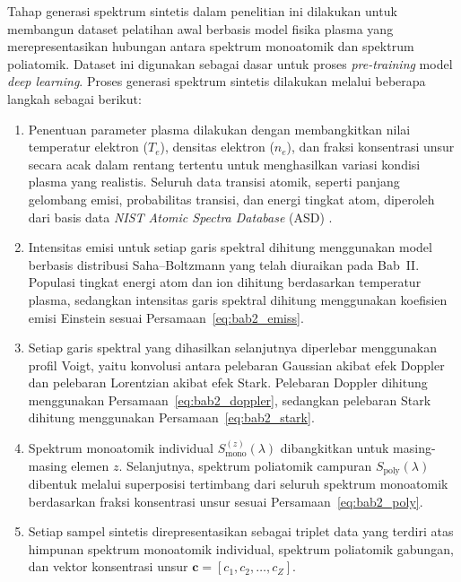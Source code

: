 Tahap generasi spektrum sintetis dalam penelitian ini dilakukan untuk membangun dataset pelatihan awal berbasis model fisika plasma yang merepresentasikan hubungan antara spektrum monoatomik dan spektrum poliatomik. Dataset ini digunakan sebagai dasar untuk proses \textit{pre-training} model \textit{deep learning}. Proses generasi spektrum sintetis dilakukan melalui beberapa langkah sebagai berikut:

\begin{enumerate}
    \item Penentuan parameter plasma dilakukan dengan membangkitkan nilai temperatur elektron ($T_e$), densitas elektron ($n_e$), dan fraksi konsentrasi unsur secara acak dalam rentang tertentu untuk menghasilkan variasi kondisi plasma yang realistis. Seluruh data transisi atomik, seperti panjang gelombang emisi, probabilitas transisi, dan energi tingkat atom, diperoleh dari basis data \textit{NIST Atomic Spectra Database} (ASD) \citep{kramida_nist_2024}.

    \item Intensitas emisi untuk setiap garis spektral dihitung menggunakan model berbasis distribusi Saha--Boltzmann yang telah diuraikan pada Bab~II. Populasi tingkat energi atom dan ion dihitung berdasarkan temperatur plasma, sedangkan intensitas garis spektral dihitung menggunakan koefisien emisi Einstein sesuai Persamaan~\ref{eq:bab2_emiss}.

    \item Setiap garis spektral yang dihasilkan selanjutnya diperlebar menggunakan profil Voigt, yaitu konvolusi antara pelebaran Gaussian akibat efek Doppler dan pelebaran Lorentzian akibat efek Stark. Pelebaran Doppler dihitung menggunakan Persamaan~\ref{eq:bab2_doppler}, sedangkan pelebaran Stark dihitung menggunakan Persamaan~\ref{eq:bab2_stark}.

    \item Spektrum monoatomik individual $S_{\mathrm{mono}}^{(z)}(\lambda)$ dibangkitkan untuk masing-masing elemen $z$. Selanjutnya, spektrum poliatomik campuran $S_{\mathrm{poly}}(\lambda)$ dibentuk melalui superposisi tertimbang dari seluruh spektrum monoatomik berdasarkan fraksi konsentrasi unsur sesuai Persamaan~\ref{eq:bab2_poly}.

    \item Setiap sampel sintetis direpresentasikan sebagai triplet data yang terdiri atas himpunan spektrum monoatomik individual, spektrum poliatomik gabungan, dan vektor konsentrasi unsur $\mathbf{c} = [c_1, c_2, \ldots, c_Z]$.


\end{enumerate}
